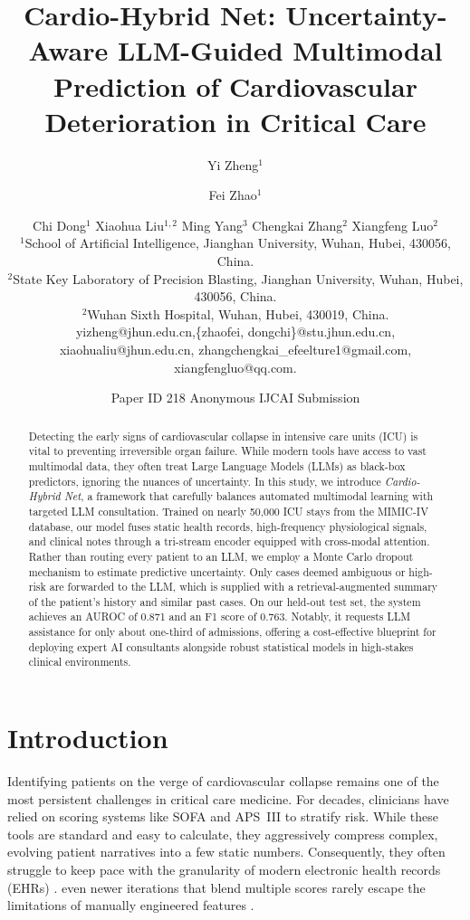 \documentclass{article}
\title{Cardio-Hybrid Net: Uncertainty-Aware LLM-Guided Multimodal\\
Prediction of Cardiovascular Deterioration in Critical Care}
\author{
Yi Zheng$^1$
\and
Fei Zhao$^1$\and
Chi Dong$^1$\And
Xiaohua Liu$^{1,2}$\And
Ming Yang$^3$\And
Chengkai Zhang$^2$\And
Xiangfeng Luo$^2$\\
\affiliations
$^1$School of Artificial Intelligence, Jianghan University, Wuhan, Hubei, 430056, China.\\
$^2$State Key Laboratory of Precision Blasting, Jianghan University, Wuhan, Hubei, 430056, China.\\
$^2$Wuhan Sixth Hospital, Wuhan, Hubei, 430019, China.\\
\emails
yizheng@jhun.edu.cn,\{zhaofei, dongchi\}@stu.jhun.edu.cn,
xiaohualiu@jhun.edu.cn,
zhangchengkai\_efeelture1@gmail.com,
xiangfengluo@qq.com.
}
\author{
    Paper ID 218
    \affiliations
    Anonymous IJCAI Submission
}
\begin{document}
\maketitle

\begin{abstract}
Detecting the early signs of cardiovascular collapse in intensive care units (ICU) is vital to preventing irreversible organ failure. While modern tools have access to vast multimodal data, they often treat Large Language Models (LLMs) as black-box predictors, ignoring the nuances of uncertainty. In this study, we introduce \emph{Cardio-Hybrid Net}, a framework that carefully balances automated multimodal learning with targeted LLM consultation. Trained on nearly 50,000 ICU stays from the MIMIC-IV database, our model fuses static health records, high-frequency physiological signals, and clinical notes through a tri-stream encoder equipped with cross-modal attention. Rather than routing every patient to an LLM, we employ a Monte Carlo dropout mechanism to estimate predictive uncertainty. Only cases deemed ambiguous or high-risk are forwarded to the LLM, which is supplied with a retrieval-augmented summary of the patient's history and similar past cases. On our held-out test set, the system achieves an AUROC of 0.871 and an F1 score of 0.763. Notably, it requests LLM assistance for only about one-third of admissions, offering a cost-effective blueprint for deploying expert AI consultants alongside robust statistical models in high-stakes clinical environments.
\end{abstract}




\section{Introduction}

Identifying patients on the verge of cardiovascular collapse remains one of the most persistent challenges in critical care medicine. For decades, clinicians have relied on scoring systems like SOFA and APS~III to stratify risk. While these tools are standard and easy to calculate, they aggressively compress complex, evolving patient narratives into a few static numbers. Consequently, they often struggle to keep pace with the granularity of modern electronic health records (EHRs) \cite{Vincent1996SOFA,Knaus1991APACHEIII,Zimmerman2006APACHE4,Lee2017SOFAAPACHEII}. even newer iterations that blend multiple scores rarely escape the limitations of manually engineered features \cite{Huang2022RAAS}.
\end{document}

